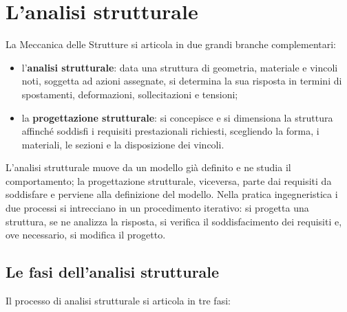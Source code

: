 \section{L'analisi strutturale}

La Meccanica delle Strutture si articola in due grandi branche complementari:

\begin{itemize}[nosep]
	\item l'\textbf{analisi strutturale}: data una struttura di geometria, materiale e vincoli noti, soggetta ad azioni assegnate, si determina la sua risposta in termini di spostamenti, deformazioni, sollecitazioni e tensioni;
	\item la \textbf{progettazione strutturale}: si concepisce e si dimensiona la struttura affinché soddisfi i requisiti prestazionali richiesti, scegliendo la forma, i materiali, le sezioni e la disposizione dei vincoli.
\end{itemize}

L'analisi strutturale muove da un modello già definito e ne studia il comportamento; la progettazione strutturale, viceversa, parte dai requisiti da soddisfare e perviene alla definizione del modello. Nella pratica ingegneristica i due processi si intrecciano in un procedimento iterativo: si progetta una struttura, se ne analizza la risposta, si verifica il soddisfacimento dei requisiti e, ove necessario, si modifica il progetto.

\subsection{Le fasi dell'analisi strutturale}

Il processo di analisi strutturale si articola in tre fasi:

